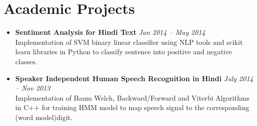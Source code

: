 \documentclass[margin,line]{resume}
\begin{document}
\begin{resume}
\begin{itemize}
    \end{itemize}



    \section{\mysidestyle Academic Projects}
    \vspace{0mm}
       \begin{itemize}
            \item \textbf{Sentiment Analysis for Hindi Text} \hfill \textsl{Jan 2014 -- May 2014}\\ Implementation of SVM binary linear classifier using NLP tools and scikit learn libraries in Python to classify sentence into positive and negative classes.
            \item \textbf{Speaker Independent Human Speech Recognition in Hindi} \hfill \textsl{July 2014 -- Nov 2013}\\ Implementation of Baum Welch, Backward/Forward and Viterbi Algorithms in C++ for training HMM model to map speech signal to the corresponding (word model)digit.
       \end{itemize}

\end{resume}
\end{document}
